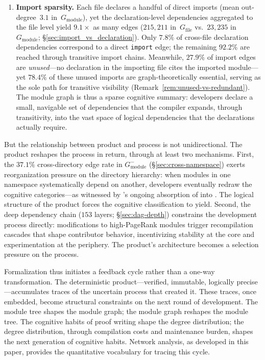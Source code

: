 \begin{enumerate}
\item \textbf{Import sparsity.} Each file declares a handful of direct imports (mean out-degree~$3.1$ in~$G_{\mathrm{module}}$), yet the declaration-level dependencies aggregated to the file level yield $9.1\times$ as many edges ($215{,}211$ in~$G_{\mathrm{file}}$ vs.\ $23{,}235$ in~$G_{\mathrm{module}}$; \S\ref{sec:import_vs_declaration}). Only $7.8\%$ of cross-file declaration dependencies correspond to a direct \texttt{import} edge; the remaining $92.2\%$ are reached through transitive import chains. Meanwhile, $27.9\%$ of import edges are \emph{unused}---no declaration in the importing file cites the imported module---yet $78.4\%$ of these unused imports are graph-theoretically essential, serving as the sole path for transitive visibility (Remark~\ref{rem:unused-vs-redundant}). The module graph is thus a sparse cognitive summary: developers declare a small, navigable set of dependencies that the compiler expands, through transitivity, into the vast space of logical dependencies that the declarations actually require.
\end{enumerate}

But the relationship between product and process is not unidirectional. The product reshapes the process in return, through at least two mechanisms. First, the $37.1\%$ cross-directory edge rate in $G_{\mathrm{module}}^{-}$ (\S\ref{sec:cross-namespace}) exerts reorganization pressure on the directory hierarchy: when modules in one namespace systematically depend on another, developers eventually redraw the cognitive categories---as witnessed by 's ongoing absorption of  into . The logical structure of the product forces the cognitive classification to yield. Second, the deep dependency chain ($153$ layers; \S\ref{sec:dag-depth}) constrains the development process directly: modifications to high-PageRank modules trigger recompilation cascades that shape contributor behavior, incentivizing stability at the core and experimentation at the periphery. The product's architecture becomes a selection pressure on the process.

Formalization thus initiates a feedback cycle rather than a one-way transformation. The deterministic product---verified, immutable, logically precise---accumulates traces of the uncertain process that created it. These traces, once embedded, become structural constraints on the next round of development. The module tree shapes the module graph; the module graph reshapes the module tree. The cognitive habits of proof writing shape the degree distribution; the degree distribution, through compilation costs and maintenance burden, shapes the next generation of cognitive habits. Network analysis, as developed in this paper, provides the quantitative vocabulary for tracing this cycle.

